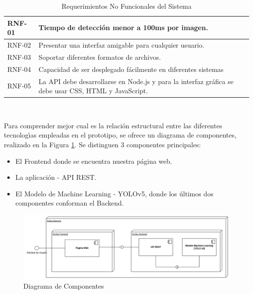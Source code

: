 \begin{table}[h!]
    \begin{tabular}{ | p{2cm} |p{10cm}| }
        \hline
        \rowcolor[HTML]{d6d8ff}
        RNF-01 & Tiempo de detección menor a 100ms por imagen.\\
        \hline
        RNF-02 & Presentar una interfaz amigable para cualquier usuario.\\
        \hline
        \rowcolor[HTML]{d6d8ff}
        RNF-03 & Soportar diferentes formatos de archivos. \\
        \hline
        RNF-04 & Capacidad de ser desplegado fácilmente en diferentes sistemas\\
        \hline
        \rowcolor[HTML]{d6d8ff}
        RNF-05 & La API debe desarrollarse en Node.js y para la interfaz gráfica se debe usar CSS, HTML y JavaScript.\\
        \hline
    \end{tabular}\\
    \caption{Requerimientos No Funcionales del Sistema}
    \label{reqnf}
\end{table}

\newpage
Para comprender mejor cual es la relación estructural entre las diferentes tecnologı́as empleadas en el prototipo, se ofrece un diagrama de componentes, realizado en la Figura \ref{fig:componentes}. Se distinguen 3 componentes principales:
\begin{itemize}
    \item El Frontend donde se encuentra nuestra página web.
    \item La aplicación - API REST.
    \item El Modelo de Machine Learning - YOLOv5, donde los últimos dos componentes conforman el Backend.
\end{itemize}

\begin{figure}[h!]
    \centering
    \includegraphics[width=1\textwidth]{img/Diagrama de Componentes.drawio.png}
    \caption{Diagrama de Componentes}
    \label{fig:componentes}
\end{figure}

